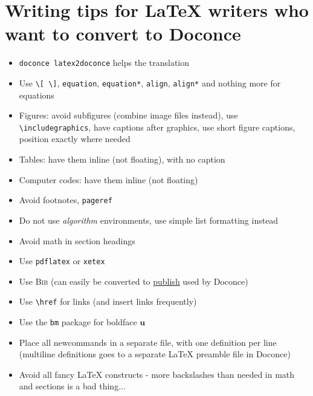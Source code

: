 \documentclass[%
twoside,                 %
final,                   %
chapterprefix=true,      %
open=right               %
10pt]{book}
\newcounter{doconce:movie:counter}
\newcounter{doconce:exercise:counter}
\begin{document}
\noindent
\section*{Writing tips for {\LaTeX} writers who want to convert to Doconce}

\begin{itemize}
 \item \Verb!doconce latex2doconce! helps the translation

 \item Use \Verb!\[ \]!, \Verb!equation!, \Verb!equation*!, \Verb!align!, \Verb!align*! and nothing more for
   equations

 \item Figures: avoid subfigures (combine image files instead), use \Verb!\includegraphics!, have captions after graphics, use short figure captions, position exactly where needed

 \item Tables: have them inline (not floating), with no caption

 \item Computer codes: have them inline (not floating)

 \item Avoid footnotes, \Verb!pageref!

 \item Do not use \emph{algorithm} environments, use simple list formatting instead

 \item Avoid math in section headings

 \item Use \Verb!pdflatex! or \Verb!xetex!

 \item Use \textsc{Bib}\negthinspace{\TeX} (can easily be converted to \href{{https://bitbucket.org/logg/publish}}{publish} used by Doconce)

 \item Use \Verb!\href! for links (and insert links frequently)

 \item Use the \Verb!bm! package for boldface $\bm{u}$

 \item Place all newcommands in a separate file, with one definition per line
   (multiline definitions goes to a separate {\LaTeX} preamble file in Doconce)

 \item Avoid all fancy {\LaTeX} constructs - more backslashes than needed in math
   and sections is a bad thing...
\end{itemize}
\end{document}

